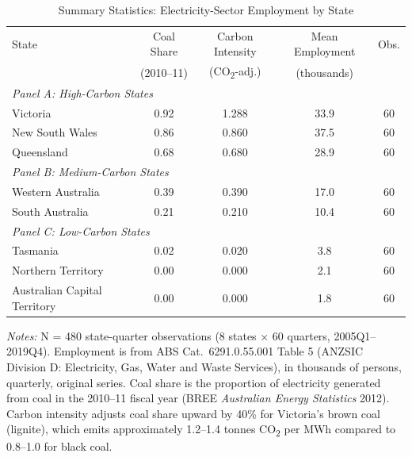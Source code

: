 \begin{table}[H]
\centering
\caption{Summary Statistics: Electricity-Sector Employment by State}
\begin{threeparttable}
\begin{tabular}{lcccc}
\toprule
State & Coal Share & Carbon Intensity & Mean Employment & Obs. \\
 & (2010--11) & (CO\textsubscript{2}-adj.) & (thousands) & \\
\midrule
\multicolumn{5}{l}{\textit{Panel A: High-Carbon States}} \\
Victoria & 0.92 & 1.288 & 33.9 & 60 \\
New South Wales & 0.86 & 0.860 & 37.5 & 60 \\
Queensland & 0.68 & 0.680 & 28.9 & 60 \\
\midrule
\multicolumn{5}{l}{\textit{Panel B: Medium-Carbon States}} \\
Western Australia & 0.39 & 0.390 & 17.0 & 60 \\
South Australia & 0.21 & 0.210 & 10.4 & 60 \\
\midrule
\multicolumn{5}{l}{\textit{Panel C: Low-Carbon States}} \\
Tasmania & 0.02 & 0.020 & 3.8 & 60 \\
Northern Territory & 0.00 & 0.000 & 2.1 & 60 \\
Australian Capital Territory & 0.00 & 0.000 & 1.8 & 60 \\
\bottomrule
\end{tabular}
\begin{tablenotes}[flushleft]
\small
\item \textit{Notes:} N = 480 state-quarter observations (8 states $\times$ 60 quarters, 2005Q1--2019Q4). Employment is from ABS Cat.\ 6291.0.55.001 Table 5 (ANZSIC Division D: Electricity, Gas, Water and Waste Services), in thousands of persons, quarterly, original series. Coal share is the proportion of electricity generated from coal in the 2010--11 fiscal year (BREE \emph{Australian Energy Statistics} 2012). Carbon intensity adjusts coal share upward by 40\% for Victoria's brown coal (lignite), which emits approximately 1.2--1.4 tonnes CO\textsubscript{2} per MWh compared to 0.8--1.0 for black coal.
\end{tablenotes}
\end{threeparttable}
\label{tab:summary}
\end{table}

